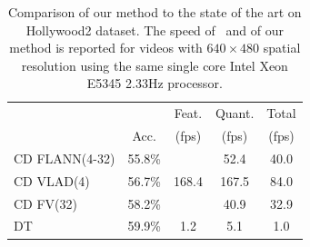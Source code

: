 \documentclass[10pt,twocolumn,letterpaper]{article}
\begin{document}

\begin{table}
\begin{center}
\begin{tabular}{|l|c|c|c|c|}
\hline
		 				&  	 		& Feat.                   	& Quant. 		& Total		\\
		 				& Acc.  	& (fps)								& (fps)			& (fps)		\\\hline
CD FLANN(4-32)	& 55.8\%	& \multirow{3}{*}{168.4} 	& 52.4    	& 40.0 	\\ %
CD VLAD(4) 		& 56.7\%	&										& 167.5	& 84.0	\\ %
CD FV(32)			& 58.2\%	&										& 40.9 	& 32.9	\\ %
\hline
DT \cite{Wang12}& 59.9\%		& 1.2									& 5.1 		&	1.0	\\\hline %
\end{tabular}
\mbox{}\\
\caption{Comparison of our method to the state of the art on Hollywood2 dataset. The speed of~\cite{Wang12} and of our method is reported for videos with $640\times 480$ spatial resolution using the same single core Intel Xeon E5345 2.33Hz processor.\vspace{-.3cm}}
\label{tab:hwd2_comparison}
\end{center}
\end{table}
\end{document}
